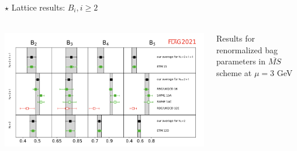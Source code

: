 \documentclass{beamer}
\begin{document}
\begin{frame}[noframenumbering]{$\star$ Lattice results: $B_i, i \ge 2$}
      \framesubtitle{\hspace*{1pt}}
      \begin{columns}
            \begin{column}{0.75\textwidth}
                  \includegraphics[width=\textwidth]{assets/Bi3GeV-falg2021.png}
            \end{column}
            \begin{column}{0.3\textwidth}
                  Results for renormalized bag parameters in $\overline{MS}$ scheme at $\mu = 3$ GeV
            \end{column}
      \end{columns}
\end{frame}
\end{document}
